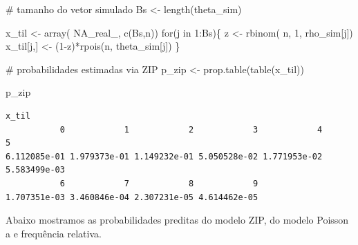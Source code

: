 \documentclass[
  letterpaper,
  DIV=11,
  numbers=noendperiod]{scrreprt}
\newenvironment{Shaded}{\begin{snugshade}}{\end{snugshade}}
\newcommand{\CommentTok}[1]{\textcolor[rgb]{0.37,0.37,0.37}{#1}}
\newcommand{\ConstantTok}[1]{\textcolor[rgb]{0.56,0.35,0.01}{#1}}
\newcommand{\ControlFlowTok}[1]{\textcolor[rgb]{0.00,0.23,0.31}{#1}}
\newcommand{\DecValTok}[1]{\textcolor[rgb]{0.68,0.00,0.00}{#1}}
\newcommand{\FunctionTok}[1]{\textcolor[rgb]{0.28,0.35,0.67}{#1}}
\newcommand{\NormalTok}[1]{\textcolor[rgb]{0.00,0.23,0.31}{#1}}
\newcommand{\OtherTok}[1]{\textcolor[rgb]{0.00,0.23,0.31}{#1}}
\newcommand{\SpecialCharTok}[1]{\textcolor[rgb]{0.37,0.37,0.37}{#1}}
\theoremstyle{definition}
\theoremstyle{definition}
\theoremstyle{remark}
\begin{document}
\begin{Shaded}
\begin{Highlighting}[]
\CommentTok{\# tamanho do vetor simulado}
\NormalTok{Bs }\OtherTok{\textless{}{-}} \FunctionTok{length}\NormalTok{(theta\_sim)}

\NormalTok{x\_til }\OtherTok{\textless{}{-}} \FunctionTok{array}\NormalTok{( }\ConstantTok{NA\_real\_}\NormalTok{, }\FunctionTok{c}\NormalTok{(Bs,n))}
\ControlFlowTok{for}\NormalTok{(j }\ControlFlowTok{in} \DecValTok{1}\SpecialCharTok{:}\NormalTok{Bs)\{}
\NormalTok{  z }\OtherTok{\textless{}{-}} \FunctionTok{rbinom}\NormalTok{( n, }\DecValTok{1}\NormalTok{, rho\_sim[j])}
\NormalTok{  x\_til[j,] }\OtherTok{\textless{}{-}}\NormalTok{ (}\DecValTok{1}\SpecialCharTok{{-}}\NormalTok{z)}\SpecialCharTok{*}\FunctionTok{rpois}\NormalTok{(n, theta\_sim[j])}
\NormalTok{\}}

\CommentTok{\# probabilidades estimadas via ZIP}
\NormalTok{p\_zip }\OtherTok{\textless{}{-}} \FunctionTok{prop.table}\NormalTok{(}\FunctionTok{table}\NormalTok{(x\_til))}

\NormalTok{p\_zip}
\end{Highlighting}
\end{Shaded}

\begin{verbatim}
x_til
           0            1            2            3            4            5 
6.112085e-01 1.979373e-01 1.149232e-01 5.050528e-02 1.771953e-02 5.583499e-03 
           6            7            8            9 
1.707351e-03 3.460846e-04 2.307231e-05 4.614462e-05 
\end{verbatim}

Abaixo mostramos as probabilidades preditas do modelo ZIP, do modelo
Poisson a e frequência relativa.
\end{document}
